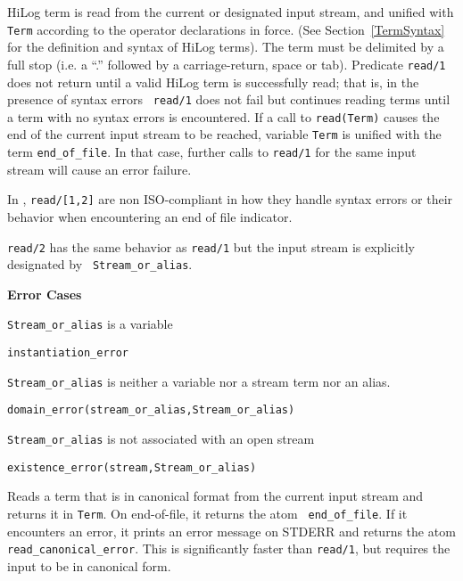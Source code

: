 \begin{description}
HiLog term is read from the current or
designated input stream, and unified with {\tt Term} according to the
operator declarations in force.  (See Section~\ref{TermSyntax} for the
definition and syntax of HiLog terms). The term must be delimited by a
full stop (i.e. a ``.'' followed by a carriage-return, space or tab).
Predicate {\tt read/1} does not return until a valid HiLog term is
successfully read; that is, in the presence of syntax errors {\tt
  read/1} does not fail but continues reading terms until a term with
no syntax errors is encountered.  If a call to {\tt read(Term)} causes
the end of the current input stream to be reached, variable {\tt Term}
is unified with the term {\tt end\_of\_file}.  In that case, further
calls to {\tt read/1} for the same input stream will cause an error
failure.

%
In \version, {\tt read/[1,2]} are non ISO-compliant in how they
handle syntax errors or their behavior when encountering an end of
file indicator.


	{\tt read/2} has the same behavior as {\tt read/1} but the
	input stream is explicitly designated by {\tt
	Stream\_or\_alias}.

{\bf Error Cases}
\bi
\item 	{\tt Stream\_or\_alias} is a variable
\bi
\item {\tt instantiation\_error}
\ei
\item 	{\tt Stream\_or\_alias} is neither a variable nor a stream term nor an alias.
\bi
\item 	{\tt domain\_error(stream\_or\_alias,Stream\_or\_alias)}
\ei
\item 	{\tt Stream\_or\_alias} is not associated with an open stream
\bi
\item 	{\tt existence\_error(stream,Stream\_or\_alias)}
\ei
\ei

Reads a term that is in canonical format from the current input stream
and returns it in {\tt Term}. On end-of-file, it returns the atom {\tt
end\_of\_file}.  If it encounters an error, it prints an error message
on STDERR and returns the atom {\tt read\_canonical\_error}. This is
significantly faster than {\tt read/1}, but requires the input to be
in canonical form.


\end{description}
